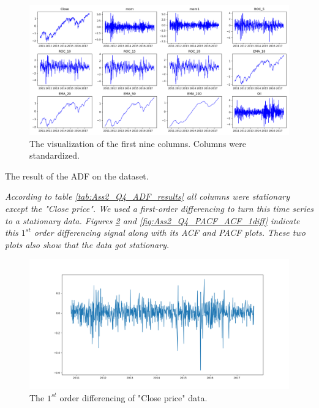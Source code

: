\begin{figure}[H]
    \centering
    \begin{minipage}[b]{1\textwidth}
        \includegraphics[width=\textwidth]{figures/Ass2/Ass2_Q4_standard_data.png}
    \end{minipage}
    \caption{The visualization of the first nine columns. Columns were standardized.}
    \label{fig:Ass2_Q4_standard_data}
\end{figure}


\begin{table}[H]
\centering
\caption{The result of the \gls{ADF} on the dataset.}
\label{tab:Ass2_Q4_ADF_results}

\end{table}

\textit{According to table \ref{tab:Ass2_Q4_ADF_results} all columns were stationary except the "Close price".  
We used a first-order differencing to turn this time series to a stationary data. Figures \ref{fig:Ass2_Q4_1diff_Close_signal} and \ref{fig:Ass2_Q4_PACF_ACF_1diff} indicate this $1^{st}$ order differencing signal along with its \gls{ACF} and \gls{PACF} plots. These two plots also show that the data got stationary.}

\begin{figure}[H]
    \centering
    \begin{minipage}[b]{1\textwidth}
        \includegraphics[width=\textwidth]{figures/Ass2/Ass2_Q4_1diff_Close_signal.png}
    \end{minipage}
    \caption{The $1^{st}$ order differencing of "Close price" data.}
    \label{fig:Ass2_Q4_1diff_Close_signal}
\end{figure}

